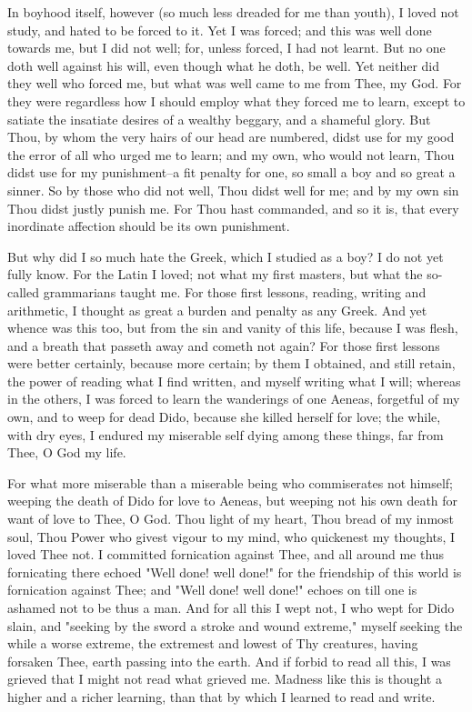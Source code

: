 \documentclass[b5paper,openright,12pt,twoside]{book}
\begin{document}
  In boyhood itself, however (so much less dreaded for me than youth),
I loved not study, and hated to be forced to it. Yet I was forced; and
this was well done towards me, but I did not well; for, unless forced, I
had not learnt. But no one doth well against his will, even though what
he doth, be well. Yet neither did they well who forced me, but what was
well came to me from Thee, my God. For they were regardless how I should
employ what they forced me to learn, except to satiate the insatiate
desires of a wealthy beggary, and a shameful glory. But Thou, by whom
the very hairs of our head are numbered, didst use for my good the error
of all who urged me to learn; and my own, who would not learn, Thou
didst use for my punishment--a fit penalty for one, so small a boy and
so great a sinner. So by those who did not well, Thou didst well for me;
and by my own sin Thou didst justly punish me. For Thou hast commanded,
and so it is, that every inordinate affection should be its own
punishment.

But why did I so much hate the Greek, which I studied as a boy? I do not
yet fully know. For the Latin I loved; not what my first masters, but
what the so-called grammarians taught me. For those first lessons,
reading, writing and arithmetic, I thought as great a burden and penalty
as any Greek. And yet whence was this too, but from the sin and vanity
of this life, because I was flesh, and a breath that passeth away and
cometh not again? For those first lessons were better certainly, because
more certain; by them I obtained, and still retain, the power of reading
what I find written, and myself writing what I will; whereas in the
others, I was forced to learn the wanderings of one Aeneas, forgetful of
my own, and to weep for dead Dido, because she killed herself for love;
the while, with dry eyes, I endured my miserable self dying among these
things, far from Thee, O God my life.

For what more miserable than a miserable being who commiserates not
himself; weeping the death of Dido for love to Aeneas, but weeping not
his own death for want of love to Thee, O God. Thou light of my heart,
Thou bread of my inmost soul, Thou Power who givest vigour to my mind,
who quickenest my thoughts, I loved Thee not. I committed fornication
against Thee, and all around me thus fornicating there echoed "Well
done! well done!" for the friendship of this world is fornication
against Thee; and "Well done! well done!" echoes on till one is ashamed
not to be thus a man. And for all this I wept not, I who wept for Dido
slain, and "seeking by the sword a stroke and wound extreme," myself
seeking the while a worse extreme, the extremest and lowest of Thy
creatures, having forsaken Thee, earth passing into the earth. And
if forbid to read all this, I was grieved that I might not read what
grieved me. Madness like this is thought a higher and a richer learning,
than that by which I learned to read and write.
\end{document}
